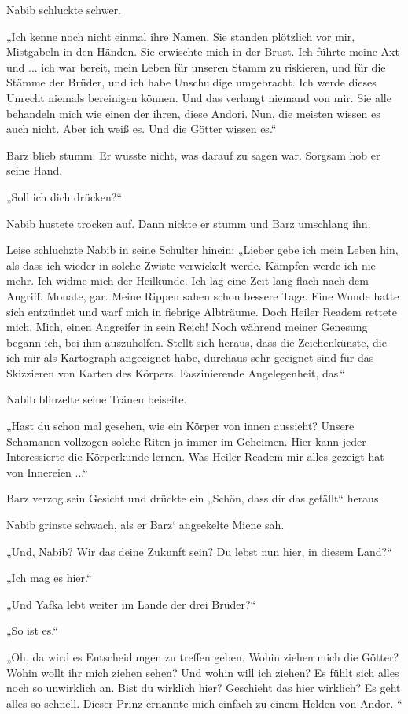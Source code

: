 Nabib schluckte schwer.

„Ich kenne noch nicht einmal ihre Namen. Sie standen plötzlich vor mir, Mistgabeln in den Händen. Sie erwischte mich in der Brust. Ich führte meine Axt und ... ich war bereit, mein Leben für unseren Stamm zu riskieren, und für die Stämme der Brüder, und ich habe Unschuldige umgebracht. Ich werde dieses Unrecht niemals bereinigen können. Und das verlangt niemand von mir. Sie alle behandeln mich wie einen der ihren, diese Andori. Nun, die meisten wissen es auch nicht. Aber ich weiß es. Und die Götter wissen es.“

Barz blieb stumm. Er wusste nicht, was darauf zu sagen war. Sorgsam hob er seine Hand.

„Soll ich dich drücken?“

Nabib hustete trocken auf. Dann nickte er stumm und Barz umschlang ihn.

Leise schluchzte Nabib in seine Schulter hinein: „Lieber gebe ich mein Leben hin, als dass ich wieder in solche Zwiste verwickelt werde. Kämpfen werde ich nie mehr. Ich widme mich der Heilkunde. Ich lag eine Zeit lang flach nach dem Angriff. Monate, gar. Meine Rippen sahen schon bessere Tage. Eine Wunde hatte sich entzündet und warf mich in fiebrige Albträume. Doch Heiler Readem rettete mich. Mich, einen Angreifer in sein Reich! Noch während meiner Genesung begann ich, bei ihm auszuhelfen. Stellt sich heraus, dass die Zeichenkünste, die ich mir als Kartograph angeeignet habe, durchaus sehr geeignet sind für das Skizzieren von Karten des Körpers. Faszinierende Angelegenheit, das.“

Nabib blinzelte seine Tränen beiseite.

„Hast du schon mal gesehen, wie ein Körper von innen aussieht? Unsere Schamanen vollzogen solche Riten ja immer im Geheimen. Hier kann jeder Interessierte die Körperkunde lernen. Was Heiler Readem mir alles gezeigt hat von Innereien ...“

Barz verzog sein Gesicht und drückte ein „Schön, dass dir das gefällt“ heraus.

Nabib grinste schwach, als er Barz‘ angeekelte Miene sah.

„Und, Nabib? Wir das deine Zukunft sein? Du lebst nun hier, in diesem Land?“

„Ich mag es hier.“

„Und Yafka lebt weiter im Lande der drei Brüder?“

„So ist es.“

„Oh, da wird es Entscheidungen zu treffen geben. Wohin ziehen mich die Götter? Wohin wollt ihr mich ziehen sehen? Und wohin will ich ziehen? Es fühlt sich alles noch so unwirklich an. Bist du wirklich hier? Geschieht das hier wirklich? Es geht alles so schnell. Dieser Prinz ernannte mich einfach zu einem Helden von Andor. “

